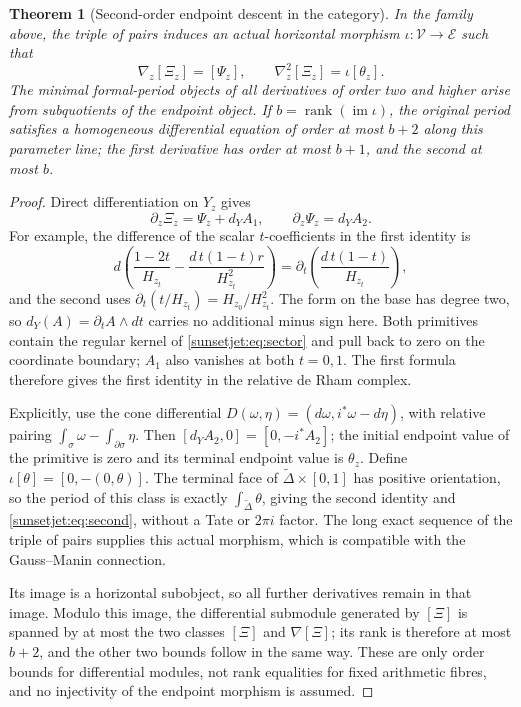\documentclass[11pt,a4paper,oneside]{article}
\theoremstyle{plain}
\newtheorem{theorem}{Theorem}[section]
\theoremstyle{definition}
\theoremstyle{remark}
\newcommand{\im}{\operatorname{im}}
\numberwithin{equation}{section}
\begin{document}
\begin{theorem}[Second-order endpoint descent in the category]\label{sunsetjet:thm:descent}
In the family above, the triple of pairs induces an actual horizontal morphism
$\iota:\mathcal V\to\mathcal E$ such that
\begin{equation}\label{sunsetjet:eq:descent}
 \nabla_z[\Xi_z]=[\Psi_z],\qquad
 \nabla_z^2[\Xi_z]=\iota[\theta_z].
\end{equation}
The minimal formal-period objects of all derivatives of order two and higher arise from subquotients of the endpoint object.
If $b=\operatorname{rank}(\im\iota)$, the original period satisfies a homogeneous differential equation of order at most $b+2$ along this parameter line;
the first derivative has order at most $b+1$, and the second at most $b$.
\end{theorem}
\begin{proof}
Direct differentiation on $Y_z$ gives
\begin{equation}\label{sunsetjet:eq:exact}
 \partial_z\Xi_z=\Psi_z+d_YA_1,\qquad
 \partial_z\Psi_z=d_YA_2.
\end{equation}
For example, the difference of the scalar $t$-coefficients in the first identity is
\[
 d\left(\frac{1-2t}{H_{z_t}}
          -\frac{d\,t(1-t)r}{H_{z_t}^2}\right)
   =\partial_t\left(\frac{d\,t(1-t)}{H_{z_t}}\right),
\]
and the second uses
$\partial_t(t/H_{z_t})=H_{z_0}/H_{z_t}^2$.
The form on the base has degree two, so $d_Y(A)=\partial_t A\wedge dt$ carries no additional minus sign here.
Both primitives contain the regular kernel of \eqref{sunsetjet:eq:sector}
and pull back to zero on the coordinate boundary; $A_1$ also vanishes at both $t=0,1$.
The first formula therefore gives the first identity in the relative de Rham complex.

Explicitly, use the cone differential
$D(\omega,\eta)=(d\omega,i^*\omega-d\eta)$,
with relative pairing $\int_\sigma\omega-\int_{\partial\sigma}\eta$.
Then $[d_YA_2,0]=[0,-i^*A_2]$;
the initial endpoint value of the primitive is zero and its terminal endpoint value is $\theta_z$.
Define $\iota[\theta]=[0,-(0,\theta)]$.
The terminal face of $\widetilde\Delta\times[0,1]$ has positive orientation,
so the period of this class is exactly $\int_{\widetilde\Delta}\theta$,
giving the second identity and \eqref{sunsetjet:eq:second}, without a Tate or $2\pi i$ factor.
The long exact sequence of the triple of pairs supplies this actual morphism, which is compatible with the Gauss--Manin connection.

Its image is a horizontal subobject, so all further derivatives remain in that image.
Modulo this image, the differential submodule generated by $[\Xi]$
is spanned by at most the two classes $[\Xi]$ and $\nabla[\Xi]$;
its rank is therefore at most $b+2$, and the other two bounds follow in the same way.
These are only order bounds for differential modules, not rank equalities for fixed arithmetic fibres,
and no injectivity of the endpoint morphism is assumed.
\end{proof}
\end{document}
